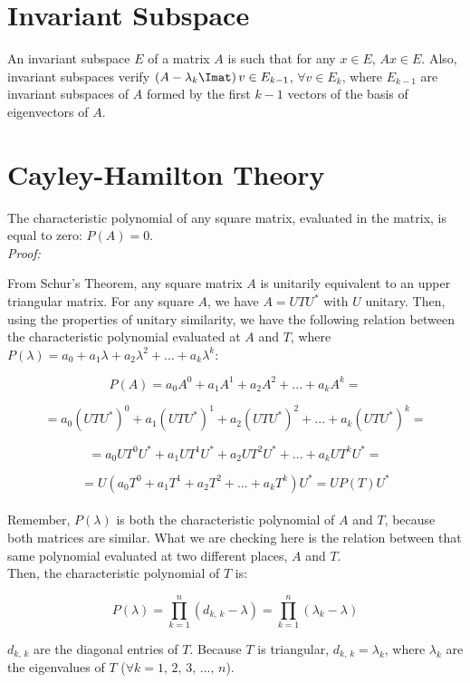 \section*{Invariant Subspace}

An invariant subspace $E$ of a matrix $A$ is such that for any $x\in E$, $Ax\in E$. Also, invariant subspaces verify $(A-\lambda_k\Imat)\,v\in E_{k-1}$, $\forall v \in E_k$, where $E_{k-1}$ are invariant subspaces of $A$ formed by the first $k-1$ vectors of the basis of eigenvectors of $A$.

\section*{Cayley-Hamilton Theory}

The characteristic polynomial of any square matrix, evaluated in the matrix, is equal to zero: $P(A)=0$.\\

\textit{Proof:}

From Schur's Theorem, any square matrix $A$ is unitarily equivalent to an upper triangular matrix. For any square $A$, we have $A=UTU^*$ with $U$ unitary. Then, using the properties of unitary similarity, we have the following relation between the characteristic polynomial evaluated at $A$ and $T$, where $P(\lambda)=a_0+a_1\lambda+a_2\lambda^2+...+a_k\lambda^k$:

$$P(A)=a_0A^0+a_1A^1+a_2A^2+...+a_kA^k=$$

$$=a_0(UTU^*)^0+a_1(UTU^*)^1+a_2(UTU^*)^2+...+a_k(UTU^*)^k=$$

$$=a_0UT^0U^*+a_1UT^1U^*+a_2UT^2U^*+...+a_kUT^kU^*=$$

$$=U(a_0T^0+a_1T^1+a_2T^2+...+a_kT^k)U^*=UP(T)U^*$$\\

Remember, $P(\lambda)$ is both the characteristic polynomial of $A$ and $T$, because both matrices are similar. What we are checking here is the relation between that same polynomial evaluated at two different places, $A$ and $T$.\\

Then, the characteristic polynomial of $T$ is:  

$$P(\lambda)=\prod_{k=1}^{n}(d_{k,\,k}-\lambda)=\prod_{k=1}^{n}(\lambda_k-\lambda)$$

$d_{k,\,k}$ are the diagonal entries of $T$. Because $T$ is triangular, $d_{k,\,k}=\lambda_k$, where $\lambda_k$ are the eigenvalues of $T$ ($\forall k=1,\,2,\,3,\,...,\,n$).\\

